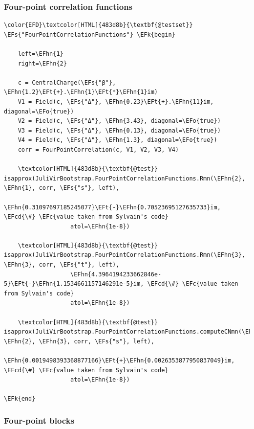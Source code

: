 \documentclass[a4paper]{article}
\numberwithin{equation}{section}
\newcommand{\EFc}[1]{\textcolor{EFc}{#1}} %
\newcommand{\EFcd}[1]{\textcolor{EFcd}{#1}} %
\newcommand{\EFs}[1]{\textcolor{EFs}{#1}} %
\newcommand{\EFk}[1]{\textcolor{EFk}{#1}} %
\newcommand{\EFt}[1]{\textcolor{EFt}{#1}} %
\newcommand{\EFo}[1]{\textcolor{EFo}{#1}} %
\newcommand{\EFhn}[1]{\textcolor{EFhn}{#1}} %
\begin{document}
\subsubsection*{Four-point correlation functions}
\label{sec:org288dd68}

\begin{Code}
\begin{Verbatim}
\color{EFD}\textcolor[HTML]{483d8b}{\textbf{@testset}} \EFs{"FourPointCorrelationFunctions"} \EFk{begin}

    left=\EFhn{1}
    right=\EFhn{2}

    c = CentralCharge(\EFs{"β"}, \EFhn{1.2}\EFt{+}.\EFhn{1}\EFt{*}\EFhn{1}im)
    V1 = Field(c, \EFs{"Δ"}, \EFhn{0.23}\EFt{+}.\EFhn{11}im, diagonal=\EFo{true})
    V2 = Field(c, \EFs{"Δ"}, \EFhn{3.43}, diagonal=\EFo{true})
    V3 = Field(c, \EFs{"Δ"}, \EFhn{0.13}, diagonal=\EFo{true})
    V4 = Field(c, \EFs{"Δ"}, \EFhn{1.3}, diagonal=\EFo{true})
    corr = FourPointCorrelation(c, V1, V2, V3, V4)

    \textcolor[HTML]{483d8b}{\textbf{@test}} isapprox(JuliVirBootstrap.FourPointCorrelationFunctions.Rmn(\EFhn{2}, \EFhn{1}, corr, \EFs{"s"}, left),
                   \EFhn{0.31097697185245077}\EFt{-}\EFhn{0.70523695127635733}im, \EFcd{\#} \EFc{value taken from Sylvain's code}
                   atol=\EFhn{1e-8})

    \textcolor[HTML]{483d8b}{\textbf{@test}} isapprox(JuliVirBootstrap.FourPointCorrelationFunctions.Rmn(\EFhn{3}, \EFhn{3}, corr, \EFs{"t"}, left),
                   \EFhn{4.3964194233662846e-5}\EFt{-}\EFhn{1.1534661157146291e-5}im, \EFcd{\#} \EFc{value taken from Sylvain's code}
                   atol=\EFhn{1e-8})

    \textcolor[HTML]{483d8b}{\textbf{@test}} isapprox(JuliVirBootstrap.FourPointCorrelationFunctions.computeCNmn(\EFhn{7}, \EFhn{2}, \EFhn{3}, corr, \EFs{"s"}, left),
                   \EFhn{0.0019498393368877166}\EFt{+}\EFhn{0.0026353877950837049}im, \EFcd{\#} \EFc{value taken from Sylvain's code}
                   atol=\EFhn{1e-8})

\EFk{end}
\end{Verbatim}
\end{Code}
\subsubsection*{Four-point blocks}
\label{sec:org8d273f5}
\end{document}
